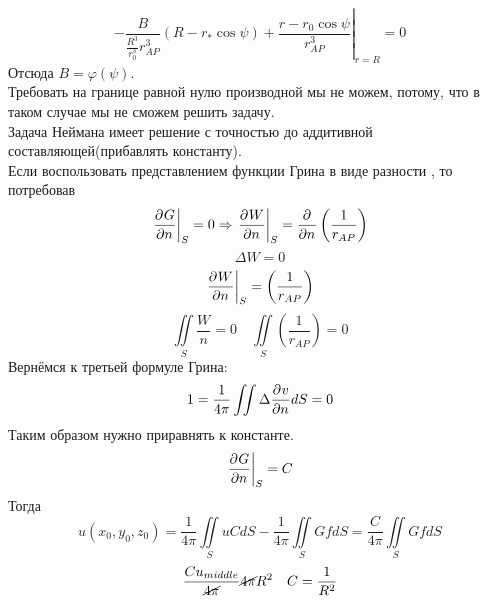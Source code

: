 \[
	\left. - \frac{B}{\frac{R^3}{r_0^3} r_{AP}^3} (R - r_* \cos \psi) + \frac{r - r_0 \cos \psi}{r_{AP}^3} \right|_{r = R} = 0
\]
Отсюда $B = \varphi(\psi)$.\\
Требовать на границе равной нулю производной мы не можем, потому, что в таком случае мы не сможем решить задачу.\\
Задача Неймана имеет решение с точностью до аддитивной составляющей(прибавлять константу).\\
Если воспользовать представлением функции Грина в виде разности , то потребовав \[
	\left. \frac{\partial^{}G}{\partial n^{}} \right|_S = 0 \Rightarrow \left. \frac{\partial^{}W}{\partial n^{}} \right|_S = \frac{\partial^{}}{\partial n^{}} \left( \frac{1}{r_{AP}}\right)
\]
\[
	\Delta W = 0
\]
\[
	\left. \frac{\partial^{}W}{\partial n^{}} \right|_S =  \left( \frac{1}{r_{AP}}\right)
\]
\[
	\iint\limits_S \frac{W}{n} = 0 \quad \iint\limits_S  \left( \frac{1}{r_{AP}}\right) = 0
\]
Вернёмся к третьей формуле Грина:\\
\[
	1 = \frac{1}{4 \pi} \iint \Delta \frac{\partial^{}v}{\partial n^{}} dS = 0
\]
Таким образом нужно приравнять к константе.
\[
	\left. \frac{\partial^{}G}{\partial n^{}} \right|_S = C
\]
Тогда \[
	u(x_0, y_0, z_0) = \frac{1}{4 \pi} \iint\limits_S u C dS - \frac{1}{4 \pi} \iint\limits_S G f dS = \frac{C}{4 \pi} \iint\limits_{S}G f dS
\]
\[
	\frac{C u_{middle}}{\cancel{4 \pi}} \cancel{4 \pi} R^2 \quad C = \frac{1}{R^2}
\]
